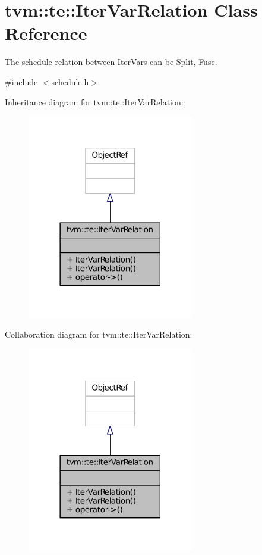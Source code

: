 \hypertarget{classtvm_1_1te_1_1IterVarRelation}{}\section{tvm\+:\+:te\+:\+:Iter\+Var\+Relation Class Reference}
\label{classtvm_1_1te_1_1IterVarRelation}


The schedule relation between Iter\+Vars can be Split, Fuse.  




{\ttfamily \#include $<$schedule.\+h$>$}



Inheritance diagram for tvm\+:\+:te\+:\+:Iter\+Var\+Relation\+:
\nopagebreak
\begin{figure}[H]
\begin{center}
\leavevmode
\includegraphics[width=206pt]{classtvm_1_1te_1_1IterVarRelation__inherit__graph}
\end{center}
\end{figure}


Collaboration diagram for tvm\+:\+:te\+:\+:Iter\+Var\+Relation\+:
\nopagebreak
\begin{figure}[H]
\begin{center}
\leavevmode
\includegraphics[width=206pt]{classtvm_1_1te_1_1IterVarRelation__coll__graph}
\end{center}
\end{figure}
